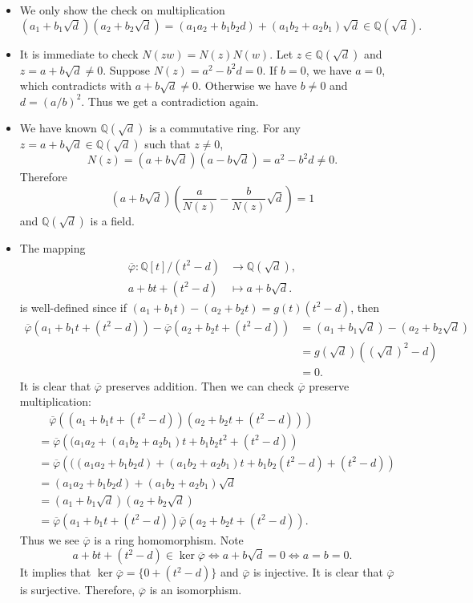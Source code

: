 \documentclass[12pt,letterpaper,boxed]{hmcpset}
\newcommand{\Q}{\mathbb{Q}}
\begin{document}
\begin{solution}
	\begin{itemize}
		\item We only show the check on multiplication
		\[
		(a_1+b_1 \sqrt{d})(a_2+b_2 \sqrt{d})=(a_1a_2+b_1b_2d)+(a_1b_2+a_2b_1)\sqrt{d}\in\Q(\sqrt{d}).
		\]
		\item It is immediate to check $N(z w)=N(z) N(w)$.	Let $z \in \mathbb{Q}(\sqrt{d})$ and $z=a+b\sqrt{d} \neq 0$. Suppose $N(z)=a^2-b^2d=0$. If $b=0$, we have $a=0$, which contradicts with $a+b\sqrt{d} \neq 0$. Otherwise we have $b\ne0$ and $d=(a/b)^2$. Thus we get a contradiction again.
		\item We have known $\mathbb{Q}(\sqrt{d})$ is a commutative ring. For any $z=a+b\sqrt{d}\in\mathbb{Q}(\sqrt{d})$ such that $z\ne0$,
		\[
		N(z)=(a+b \sqrt{d})(a-b \sqrt{d})=a^{2}-b^{2}d\ne0.
		\]
		Therefore
		\[
		\left(a+b \sqrt{d}\right)\left(\frac{a}{N(z)}-\frac{b}{N(z)} \sqrt{d}\right)=1
		\]
		and $\mathbb{Q}(\sqrt{d})$ is a field.
		\item The mapping
		\begin{align*}
		\overline{\varphi}:\mathbb{Q}[t] /\left(t^{2}-d\right)& \longrightarrow \Q(\sqrt{d}),\\
		a+bt+(t^{2}-d)& \longmapsto a+b\sqrt{d}.
		\end{align*}
		is well-defined since if $(a_1+b_1t)-(a_2+b_2t)=g(t)(t^2-d)$, then
		\begin{align*}
		\overline{\varphi}(a_1+b_1t+(t^{2}-d))-\overline{\varphi}(a_2+b_2t+(t^{2}-d))&=\left(a_1+b_1\sqrt{d}\right)-\left(a_2+b_2\sqrt{d}\right)\\
		&=g\left(\sqrt{d}\right)\left(\left(\sqrt{d}\right)^2-d\right)\\
		&=0.
		\end{align*}
		It is clear that $\overline{\varphi}$ preserves addition. Then we can check $\overline{\varphi}$ preserve multiplication:
		\begin{align*}
		&\hspace{1em}\overline{\varphi}\left((a_1+b_1t+(t^{2}-d))(a_2+b_2t+(t^{2}-d))\right)\\
		&=\overline{\varphi}\left((a_1a_2+(a_1b_2+a_2b_1)t+b_1b_2t^2+(t^{2}-d)\right)\\
		&=\overline{\varphi}\left(((a_1a_2+b_1b_2d)+(a_1b_2+a_2b_1)t+b_1b_2(t^2-d)+(t^{2}-d)\right)\\
		&=(a_1a_2+b_1b_2d)+(a_1b_2+a_2b_1)\sqrt{d}\\
		&=(a_1+b_1\sqrt{d})(a_2+b_2\sqrt{d})\\
		&=\overline{\varphi}\left(a_1+b_1t+(t^{2}-d)\right)\overline{\varphi}\left(a_2+b_2t+(t^{2}-d)\right).
		\end{align*}
		Thus we see $\overline{\varphi}$ is a ring homomorphism. Note
		\[
		a+bt+(t^{2}-d)\in\ker \overline{\varphi}\iff a+b\sqrt{d}=0\iff a=b=0.
		\]
		It implies that $\ker \overline{\varphi}=\{0+(t^2-d)\}$ and $\overline{\varphi}$ is injective. It is clear that $\overline{\varphi}$ is surjective. Therefore, $\overline{\varphi}$ is an isomorphism.
	\end{itemize}
\end{solution}
\end{document}
